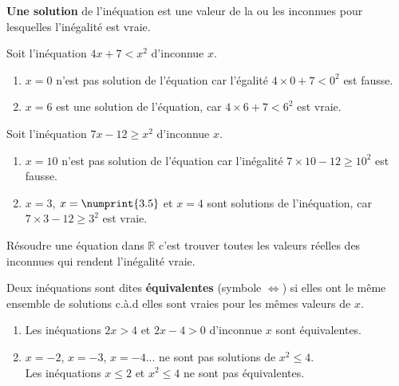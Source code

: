 \documentclass[main.tex]{subfiles}
\begin{document}
 \textbf{Une solution} de l’inéquation est une valeur de la ou les inconnues pour lesquelles l’inégalité est vraie. 
 \begin{example}%
 	Soit l'inéquation $4x+7<x^2$ d'inconnue $x$.
 	\begin{enumerate}[label=\alph*),leftmargin=*]
 		\item  		$x=0$ n'est pas solution de l'équation car l'égalité $4\times 0+7<0^2$ est fausse.
 		\item $x=6$ est une solution de l'équation, car $4\times 6+7<6^2$ est vraie.
 	\end{enumerate}
 \end{example}
 \begin{example}%
	Soit l'inéquation $7x-12\geqslant x^2$ d'inconnue $x$.
	\begin{enumerate}[label=\alph*),leftmargin=*]
		\item $x=10$ n'est pas solution de l'équation car l'inégalité $7\times 10-12\geqslant 10^2$ est fausse.
		\item $x=3$,  $x=\numprint{3.5}$  et $x=4$ sont solutions de l'inéquation, car $7\times 3-12\geqslant3^2$ est vraie. 
	\end{enumerate}
\end{example}
 \begin{definition} Résoudre une équation dans $\mathbb{R}$ c'est trouver toutes les valeurs  réelles des  inconnues qui rendent l'inégalité vraie. 
 \end{definition} 
\begin{definition}
	Deux inéquations sont dites \textbf{équivalentes} (symbole $\iff$) si elles ont le même ensemble de solutions c.à.d elles sont vraies pour les mêmes valeurs de $x$.
\end{definition} 
\begin{example}\hfill 
	\begin{enumerate}[label=\alph*),leftmargin=*]
		\item Les inéquations $2x>4$ et $2x-4>0$ d'inconnue $x$ sont équivalentes.
		\item  $x=-2$, $x=-3$, $x=-4$... ne sont pas solutions de $x^2\leqslant4$.\\
		Les inéquations $x\leqslant 2$ et $x^2\leqslant 4$ ne sont pas équivalentes.
	\end{enumerate}
\end{example}
\vfill 

 
\end{document}
